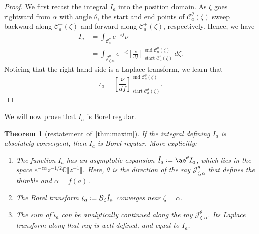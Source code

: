 \documentclass{article}
\newcommand{\C}{\mathbb{C}}
\newcommand{\series}[1]{\tilde{#1}}
\newcommand*{\defeq}{\mathrel{\vcenter{\baselineskip0.5ex \lineskiplimit0pt
                     \hbox{\scriptsize.}\hbox{\scriptsize.}}}%
                     =}
\newcommand{\borel}{\mathcal{B}}
\newcommand{\aexp}{\mathrm{\ae}}
\theoremstyle{definition}
\theoremstyle{plain}
\newtheorem{theorem}{Theorem}[section]
\begin{document}
\begin{proof}
We first recast the integral $I_a$ into the position domain. As $\zeta$ goes rightward from $\alpha$ with angle $\theta$, the start and end points of $\mathcal{C}_a^\theta(\zeta)$ sweep backward along $\mathcal{C}^-_a(\zeta)$ and forward along $\mathcal{C}^+_a(\zeta)$, respectively. Hence, we have
\begin{align*}
I_a & = \int_{\mathcal{C}_a^\theta} e^{-zf} \nu \\
& = \int_{\mathcal{J}_{\zeta,\alpha}^\theta}e^{-z\zeta} \left[\frac{\nu}{df}\right]_{\operatorname{start} \mathcal{C}_a^\theta(\zeta)}^{\operatorname{end} \mathcal{C}_a^\theta(\zeta)}\,d\zeta.
\end{align*}
Noticing that the right-hand side is a Laplace transform, we learn that
\begin{equation}\label{thimble-difference}
{\iota}_a = \left[\frac{\nu}{df}\right]_{\operatorname{start} \mathcal{C}_a^\theta(\zeta)}^{\operatorname{end} \mathcal{C}_a^\theta(\zeta)}.
\end{equation}
\end{proof}
We will now prove that $I_a$ is Borel regular.
\begin{theorem}[restatement of~\ref{thm:maxim}]\label{thm:maxim-proof}
If the integral defining $I_a$ is absolutely convergent, then $I_a$ is Borel regular. More explicitly:
\begin{enumerate}
\item\label{part-1-prf} The function $I_a$ has an asymptotic expansion $\series{I}_a \defeq \aexp^\theta I_a$, which lies in the space $e^{-z \alpha} z^{-1/2} \C\llbracket z^{-1}\rrbracket$. Here, $\theta$ is the direction of the ray $\mathcal{J}^\theta_{\zeta, \alpha}$ that defines the thimble and $\alpha=f(a)$.
\item\label{part-2-prf} The Borel transform $\series{\iota}_a \defeq \borel_\zeta \series{I}_a$ converges near $\zeta = \alpha$.
\item\label{part-3-prf} The sum of $\series{\iota}_a$ can be analytically continued along the ray $\mathcal{J}_{\zeta, \alpha}^\theta$. Its Laplace transform along that ray is well-defined, and equal to $I_a$.
\end{enumerate}
\end{theorem}
\end{document}
